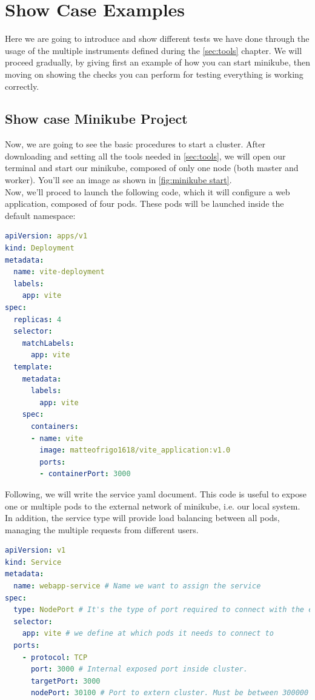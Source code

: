\section{Show Case Examples}
Here we are going to introduce and show different tests we have done through the usage of the multiple instruments defined during the \autoref{sec:tools} chapter. We will proceed gradually, by giving first an example of how you can start minikube, then moving on showing the checks you can perform for testing everything is working correctly.
\subsection{Show case Minikube Project}
Now, we are going to see the basic procedures to start a cluster. After downloading and setting all the tools needed in \autoref{sec:tools}, we will open our terminal and start our minikube, composed of only one node (both master and worker). You'll see an image as shown in \autoref{fig:minikube start}. \\
Now, we'll proced to launch the following code, which it will configure a web application, composed of four pods. These pods will be launched inside the default namespace:
\begin{lstlisting}[language=yaml, caption={Deployment web application}, label={lst:yaml_4_pods}]
apiVersion: apps/v1
kind: Deployment
metadata:
  name: vite-deployment
  labels:
    app: vite
spec:
  replicas: 4
  selector:
    matchLabels:
      app: vite
  template:
    metadata:
      labels:
        app: vite
    spec:
      containers:
      - name: vite
        image: matteofrigo1618/vite_application:v1.0
        ports:
        - containerPort: 3000
\end{lstlisting}
Following, we will write the service yaml document. This code is useful to expose one or multiple pods to the external network of minikube, i.e. our local system. In addition, the service type will provide load balancing between all pods, managing the multiple requests from different users.

\begin{lstlisting}[language=yaml, caption={Service web application service}, label={lst:yaml_4_pods_svc}]
apiVersion: v1
kind: Service
metadata:
  name: webapp-service # Name we want to assign the service
spec:
  type: NodePort # It's the type of port required to connect with the external
  selector:
    app: vite # we define at which pods it needs to connect to 
  ports:
    - protocol: TCP
      port: 3000 # Internal exposed port inside cluster.
      targetPort: 3000 
      nodePort: 30100 # Port to extern cluster. Must be between 300000 - 32767.
\end{lstlisting}

